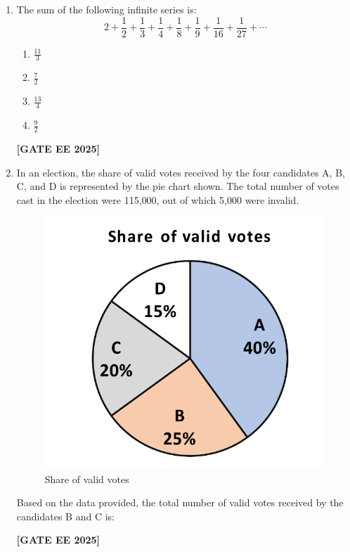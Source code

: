 \documentclass[journal]{IEEEtran}
\newcommand{\qfooter}{%
  \begin{flushright}\footnotesize\textbf{[GATE EE 2025]}\end{flushright}\vspace{1em}%
}
\begin{document}
\begin{enumerate}[leftmargin=*,label=\arabic*.]
\item The sum of the following infinite series is:
\[
2 + \frac{1}{2} + \frac{1}{3} + \frac{1}{4} + \frac{1}{8} + \frac{1}{9} + \frac{1}{16} + \frac{1}{27} + \cdots
\]
\begin{multicols}{2}
\begin{enumerate}[label=(\Alph*)]
\item $\frac{11}{3}$
\item $\frac{7}{2}$
\item $\frac{13}{4}$
\item $\frac{9}{2}$
\end{enumerate}
\qfooter
\end{multicols}

\item In an election, the share of valid votes received by the four candidates A, B, C, and D is represented by the pie chart shown.  
The total number of votes cast in the election were 115{,}000, out of which 5{,}000 were invalid.
\begin{figure}[h]
    \centering
    \includegraphics[width=0.45\columnwidth]{figs/q5.png}
    \caption{Share of valid votes}
\end{figure}
Based on the data provided, the total number of valid votes received by the candidates B and C is:
\begin{enumerate}
\qfooter
\end{enumerate}


\end{enumerate}
\end{document}
